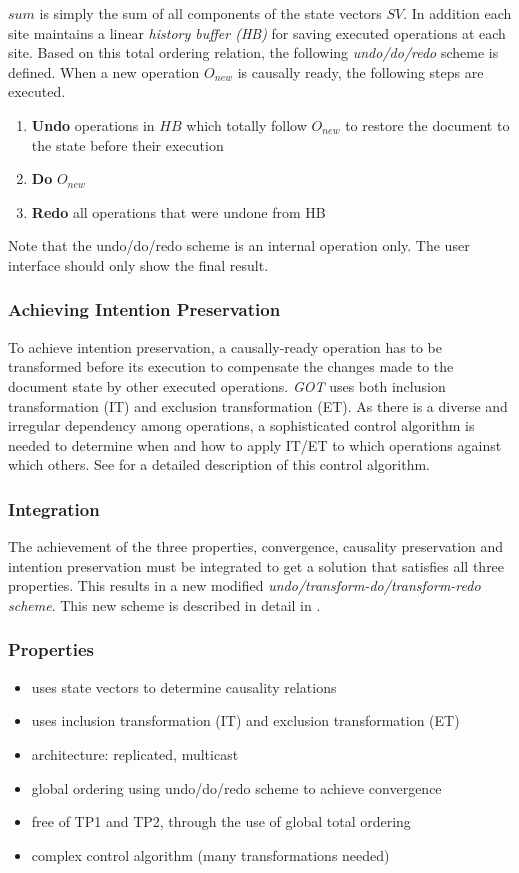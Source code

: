 $sum$ is simply the sum of all components of the state vectors $SV$. In addition each site maintains a linear \emph{history buffer (HB)} for saving executed operations at each site. Based on this total ordering relation, the following \emph{undo/do/redo} scheme is defined. When a new operation $O_{new}$ is causally ready, the following steps are executed.

\begin{enumerate}
 \item \textbf{Undo} operations in $HB$ which totally follow $O_{new}$ to 
       restore the document to the state before their execution
 \item \textbf{Do} $O_{new}$
 \item \textbf{Redo} all operations that were undone from HB
\end{enumerate}

Note that the undo/do/redo scheme is an internal operation only. The user interface should only show the final result.


\subsubsection{Achieving Intention Preservation}
To achieve intention preservation, a causally-ready operation has to be transformed before its execution to compensate the changes made to the document state by other executed operations. \emph{GOT} uses both inclusion transformation (IT) and exclusion transformation (ET). As there is a diverse and irregular dependency among operations, a sophisticated control algorithm is needed to determine when and how to apply IT/ET to which operations against which others. See \cite{sun98a} for a detailed description of this control algorithm.


\subsubsection{Integration}
The achievement of the three properties, convergence, causality preservation and intention preservation must be integrated to get a solution that satisfies all three properties. This results in a new modified \emph{undo/transform-do/transform-redo scheme}. This new scheme is described in detail in \cite{sun98b}.


\subsubsection{Properties}
\begin{itemize}
 \item uses state vectors to determine causality relations
 \item uses inclusion transformation (IT) and exclusion transformation (ET)
 \item architecture: replicated, multicast
 \item global ordering using undo/do/redo scheme to achieve convergence
 \item free of TP1 and TP2, through the use of global total ordering
 \item complex control algorithm (many transformations needed)
\end{itemize}


